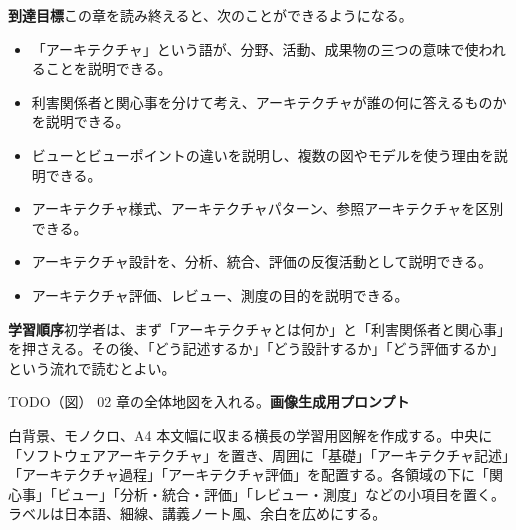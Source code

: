 \documentclass[a4paper,11pt]{ltjsarticle}
\newcommand{\todofig}[2]{\begin{statementbox}{TODO（図） #1}\textbf{画像生成用プロンプト}\par #2\end{statementbox}}
\begin{document}
\noindent\textbf{到達目標}\quad この章を読み終えると、次のことができるようになる。
\begin{itemize}
  \item 「アーキテクチャ」という語が、分野、活動、成果物の三つの意味で使われることを説明できる。
  \item 利害関係者と関心事を分けて考え、アーキテクチャが誰の何に答えるものかを説明できる。
  \item ビューとビューポイントの違いを説明し、複数の図やモデルを使う理由を説明できる。
  \item アーキテクチャ様式、アーキテクチャパターン、参照アーキテクチャを区別できる。
  \item アーキテクチャ設計を、分析、統合、評価の反復活動として説明できる。
  \item アーキテクチャ評価、レビュー、測度の目的を説明できる。
\end{itemize}

\noindent\textbf{学習順序}\quad 初学者は、まず「アーキテクチャとは何か」と「利害関係者と関心事」を押さえる。その後、「どう記述するか」「どう設計するか」「どう評価するか」という流れで読むとよい。

\todofig{02 章の全体地図を入れる。}{白背景、モノクロ、A4 本文幅に収まる横長の学習用図解を作成する。中央に「ソフトウェアアーキテクチャ」を置き、周囲に「基礎」「アーキテクチャ記述」「アーキテクチャ過程」「アーキテクチャ評価」を配置する。各領域の下に「関心事」「ビュー」「分析・統合・評価」「レビュー・測度」などの小項目を置く。ラベルは日本語、細線、講義ノート風、余白を広めにする。}
\end{document}
